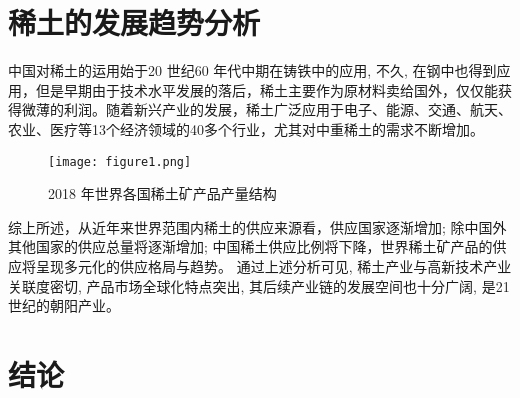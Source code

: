 \documentclass[twoside,twocolumn]{article}
\begin{document}
\section{稀土的发展趋势分析}
中国对稀土的运用始于20 世纪60 年代中期在铸铁中的应用, 不久, 在钢中也得到应用，但是早期由于技术水平发展的落后，稀土主要作为原材料卖给国外，仅仅能获得微薄的利润。随着新兴产业的发展，稀土广泛应用于电子、能源、交通、航天、农业、医疗等13个经济领域的40多个行业，尤其对中重稀土的需求不断增加。
\begin{figure}[h]
  \centering
  \texttt{[image: figure1.png]}
  \caption{2018 年世界各国稀土矿产品产量结构}\cite{RN8}
\end{figure}
综上所述，从近年来世界范围内稀土的供应来源看，供应国家逐渐增加; 除中国外其他国家的供应总量将逐渐增加; 中国稀土供应比例将下降，世界稀土矿产品的供应将呈现多元化的供应格局与趋势。
通过上述分析可见, 稀土产业与高新技术产业关联度密切, 产品市场全球化特点突出, 其后续产业链的发展空间也十分广阔, 是21 世纪的朝阳产业。



\section{结论}





\end{document}
